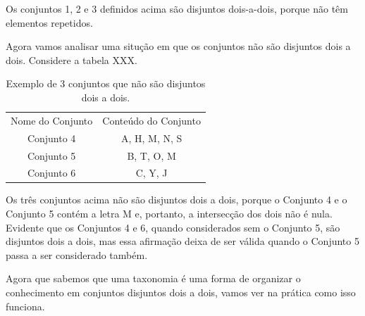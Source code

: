 \documentclass[
12pt,		%
openright,	%
twoside,  %
a4paper,			%
chapter=TITLE,		%
english,			%
french,				%
spanish,			%
brazil				%
]{USPSC-classe/USPSC}
\begin{document}
Os conjuntos 1, 2 e 3 definidos acima s\~ao \textquotedbl disjuntos dois-a-dois\textquotedbl , porque n\~ao t\^em elementos repetidos.










Agora vamos analisar uma situ\c{c}\~ao em que os conjuntos n\~ao s\~ao disjuntos dois a dois. Considere a tabela XXX.














\begin{table}[htb]
\tiny
\caption{\label{9ff362cd60f20203c10ee684d58cf4dec084efbb}Exemplo de 3 conjuntos que n\~ao s\~ao disjuntos dois a dois.}

\centering
\begin{tabular}{|c|c|}
\hline
Nome do Conjunto  &  Conte\'udo do Conjunto \\
Conjunto 4  &  A, H, M, N, S \\
Conjunto 5  &  B, T, O, M \\
Conjunto 6  &  C, Y, J \\
\hline
\end{tabular}
\end{table}


Os tr\^es conjuntos acima n\~ao s\~ao disjuntos dois a dois, porque o Conjunto 4 e o Conjunto 5 cont\'em a letra M e, portanto, a intersec\c{c}\~ao dos dois n\~ao \'e nula. Evidente que os Conjuntos 4 e 6, quando considerados sem o Conjunto 5, s\~ao \textquotedbl disjuntos dois a dois\textquotedbl , mas essa afirma\c{c}\~ao deixa de ser v\'alida quando o Conjunto 5 passa a ser considerado tamb\'em.










Agora que sabemos que uma taxonomia \'e uma forma de organizar o conhecimento em conjuntos disjuntos dois a dois, vamos ver na pr\'atica como isso funciona.
\end{document}
